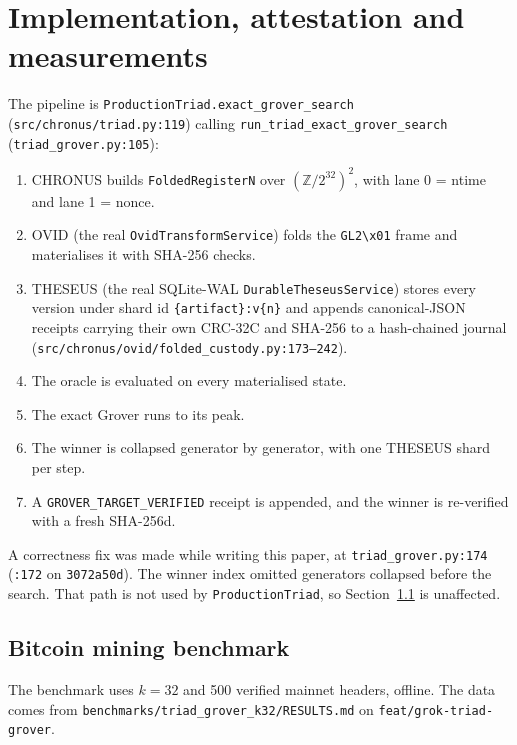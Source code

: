 \documentclass[11pt]{article}
\theoremstyle{definition}
\newcommand{\Z}{\mathbb{Z}}
\newcommand{\code}[1]{\texttt{\small #1}}
\begin{document}
\section{Implementation, attestation and measurements}\label{sec:impl}
The pipeline is \code{ProductionTriad.exact\_grover\_search} (\code{src/chronus/triad.py:119}) calling
\code{run\_triad\_exact\_grover\_search} (\code{triad\_grover.py:105}):
\begin{enumerate}
\item CHRONUS builds \code{FoldedRegisterN} over $(\Z/2^{32})^2$, with lane 0 = ntime and lane 1 = nonce.
\item OVID (the real \code{OvidTransformService}) folds the \code{GL2\textbackslash x01} frame and materialises it with
SHA-256 checks.
\item THESEUS (the real SQLite-WAL \code{DurableTheseusService}) stores every version under shard id
\code{\{artifact\}:v\{n\}} and appends canonical-JSON receipts carrying their own CRC-32C and SHA-256 to a hash-chained
journal (\code{src/chronus/ovid/folded\_custody.py:173--242}).
\item The oracle is evaluated on every materialised state.
\item The exact Grover runs to its peak.
\item The winner is collapsed generator by generator, with one THESEUS shard per step.
\item A \code{GROVER\_TARGET\_VERIFIED} receipt is appended, and the winner is re-verified with a fresh SHA-256d.
\end{enumerate}
A correctness fix was made while writing this paper, at \code{triad\_grover.py:174} (\code{:172} on \code{3072a50d}).
The winner index omitted generators collapsed before the search. That path is not used by \code{ProductionTriad},
so Section~\ref{sec:mining} is unaffected.

\subsection{Bitcoin mining benchmark}\label{sec:mining}
The benchmark uses $k=32$ and 500 verified mainnet headers, offline. The data comes from
\code{benchmarks/triad\_grover\_k32/RESULTS.md} on \code{feat/grok-triad-grover}.
\end{document}
